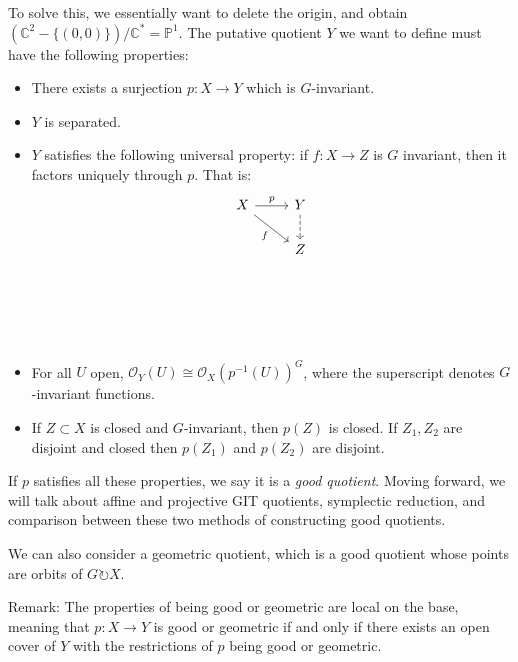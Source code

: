 \documentclass{article}
\theoremstyle{definition}
\newcommand{\C}{\mathbb{C}}
\newcommand{\bP}{\mathbb{P}}
\newcommand{\OO}{\mathcal{O}}
\begin{document}
To solve this, we essentially want to delete the origin, and obtain $\left(\C^2 - \{(0,0)\}\right)/\C^\ast = \bP^1$. The putative quotient $Y$ we want to define must have the following properties:
\begin{itemize}
	\item There exists a surjection $p:X\to Y$ which is $G$-invariant.
	\item $Y$ is separated.
	\item $Y$ satisfies the following universal property: if $f:X\to Z$ is $G$ invariant, then it factors uniquely through $p$. That is:
	\[\begin{tikzcd}
		X & Y \\
		& Z \\
		\\
		\\
		& {}
		\arrow["p", from=1-1, to=1-2]
		\arrow["f"', from=1-1, to=2-2]
		\arrow[dashed, from=1-2, to=2-2]
	\end{tikzcd}\] 
	\item For all $U$ open, $\OO_Y(U) \cong \OO_X(p^{-1}(U))^G$, where the superscript denotes $G$-invariant functions.
	\item If $Z\subset X$ is closed and $G$-invariant, then $p(Z)$ is closed. If $Z_1, Z_2$ are disjoint and closed then $p(Z_1)$ and $p(Z_2)$ are disjoint.
\end{itemize}
If $p$ satisfies all these properties, we say it is a \emph{good quotient}. Moving forward, we will talk about affine and projective GIT quotients, symplectic reduction, and comparison between these two methods of constructing good quotients. \vspace{1em}

We can also consider a geometric quotient, which is a good quotient whose points are orbits of $G\circlearrowright X$. 

Remark: The properties of being good or geometric are local on the base, meaning that $p:X\to Y$ is good or geometric if and only if there exists an open cover of $Y$ with the restrictions of $p$ being good or geometric.
\end{document}

